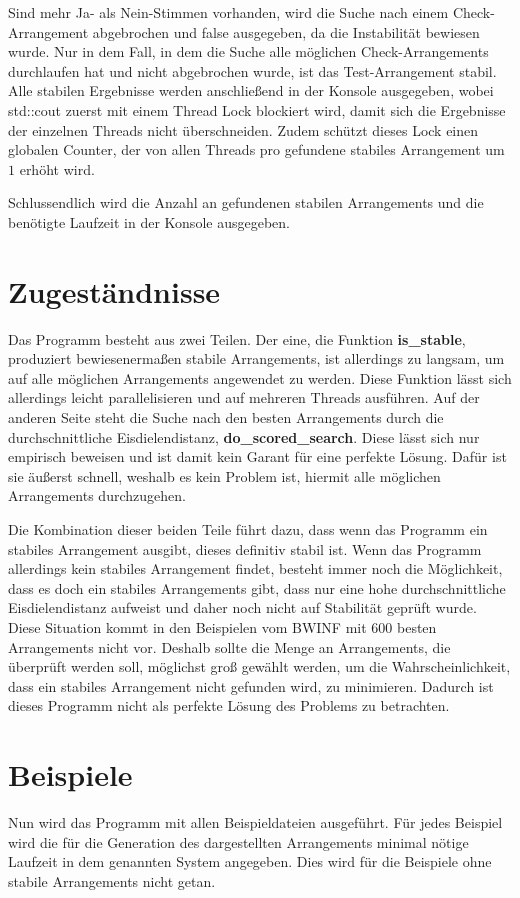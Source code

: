 \documentclass[a4paper,10pt,ngerman,captions=figureheading]{scrartcl}
\begin{document}
\medskip
Sind mehr Ja- als Nein-Stimmen vorhanden, wird die Suche nach einem Check-Arrangement abgebrochen und false ausgegeben, da die Instabilität bewiesen wurde.
Nur in dem Fall, in dem die Suche alle möglichen Check-Arrangements durchlaufen hat und nicht abgebrochen wurde, ist das Test-Arrangement stabil.
Alle stabilen Ergebnisse werden anschließend in der Konsole ausgegeben, wobei std::cout zuerst mit einem Thread Lock blockiert wird, damit sich die Ergebnisse der einzelnen Threads nicht überschneiden.
Zudem schützt dieses Lock einen globalen Counter, der von allen Threads pro gefundene stabiles Arrangement um $1$ erhöht wird.

\medskip
Schlussendlich wird die Anzahl an gefundenen stabilen Arrangements und die benötigte Laufzeit in der Konsole ausgegeben.

\section{Zugeständnisse}
Das Programm besteht aus zwei Teilen.
Der eine, die Funktion \textbf{is\_stable}, produziert bewiesenermaßen stabile Arrangements, ist allerdings zu langsam, um auf alle möglichen Arrangements angewendet zu werden.
Diese Funktion lässt sich allerdings leicht parallelisieren und auf mehreren Threads ausführen.
Auf der anderen Seite steht die Suche nach den besten Arrangements durch die durchschnittliche Eisdielendistanz, \textbf{do\_scored\_search}.
Diese lässt sich nur empirisch beweisen und ist damit kein Garant für eine perfekte Lösung.
Dafür ist sie äußerst schnell, weshalb es kein Problem ist, hiermit alle möglichen Arrangements durchzugehen.

Die Kombination dieser beiden Teile führt dazu, dass wenn das Programm ein stabiles Arrangement ausgibt, dieses definitiv stabil ist.
Wenn das Programm allerdings kein stabiles Arrangement findet, besteht immer noch die Möglichkeit, dass es doch ein stabiles Arrangements gibt, dass nur eine hohe durchschnittliche Eisdielendistanz aufweist und daher noch nicht auf Stabilität geprüft wurde.
Diese Situation kommt in den Beispielen vom BWINF mit $600$ besten Arrangements nicht vor.
Deshalb sollte die Menge an Arrangements, die überprüft werden soll, möglichst groß gewählt werden, um die Wahrscheinlichkeit, dass ein stabiles Arrangement nicht gefunden wird, zu minimieren.
Dadurch ist dieses Programm nicht als perfekte Lösung des Problems zu betrachten.

\section{Beispiele}
Nun wird das Programm mit allen Beispieldateien ausgeführt.
Für jedes Beispiel wird die für die Generation des dargestellten Arrangements minimal nötige Laufzeit in dem genannten System angegeben.
Dies wird für die Beispiele ohne stabile Arrangements nicht getan.
\end{document}
